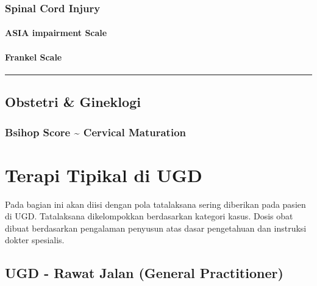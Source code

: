 \documentclass[
]{book}
\begin{document}
\hypertarget{spinal-cord-injury}{%
\subsection{Spinal Cord Injury}\label{spinal-cord-injury}}

\hypertarget{asia-impairment-scale}{%
\subsubsection{ASIA impairment Scale}\label{asia-impairment-scale}}

\hypertarget{frankel-scale}{%
\subsubsection{Frankel Scale}\label{frankel-scale}}

\begin{center}\rule{0.5\linewidth}{0.5pt}\end{center}

\hypertarget{obstetri-gineklogi}{%
\section{Obstetri \& Gineklogi}\label{obstetri-gineklogi}}

\hypertarget{bsihop-score-cervical-maturation}{%
\subsection{Bsihop Score \textasciitilde{} Cervical Maturation}\label{bsihop-score-cervical-maturation}}

\hypertarget{terapi-tipikal-di-ugd}{%
\chapter{Terapi Tipikal di UGD}\label{terapi-tipikal-di-ugd}}

Pada bagian ini akan diisi dengan pola tatalaksana sering diberikan pada pasien di UGD. Tatalaksana dikelompokkan berdasarkan kategori kasus. Dosis obat dibuat berdasarkan pengalaman penyusun atas dasar pengetahuan dan instruksi dokter spesialis.

\hypertarget{ugd---rawat-jalan-general-practitioner}{%
\section{UGD - Rawat Jalan (General Practitioner)}\label{ugd---rawat-jalan-general-practitioner}}
\end{document}
